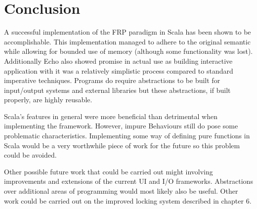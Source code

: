 \chapter{Conclusion}

A successful implementation of the FRP paradigm in Scala has been shown to be accomplishable. This implementation
managed to adhere to the original semantic while allowing for bounded use of memory (although some functionality was
lost). Additionally Echo also showed promise in actual use as building interactive application with it
was a relatively simplistic process compared to standard imperative techniques. Programs do require abstractions
to be built for input/output systems and external libraries but these abstractions, if built properly, are highly
reusable.

Scala's features in general were more beneficial than detrimental when implementing the framework. However,
impure Behaviours still do pose some problematic characteristics. Implementing some way of defining pure functions
in Scala would be a very worthwhile piece of work for the future so this problem could be avoided.

Other possible future work that could be carried out might involving improvements and extensions of the current UI
and I/O frameworks. Abstractions over additional areas of programming would most likely also be useful. Other work
could be carried out on the improved locking system described in chapter 6.